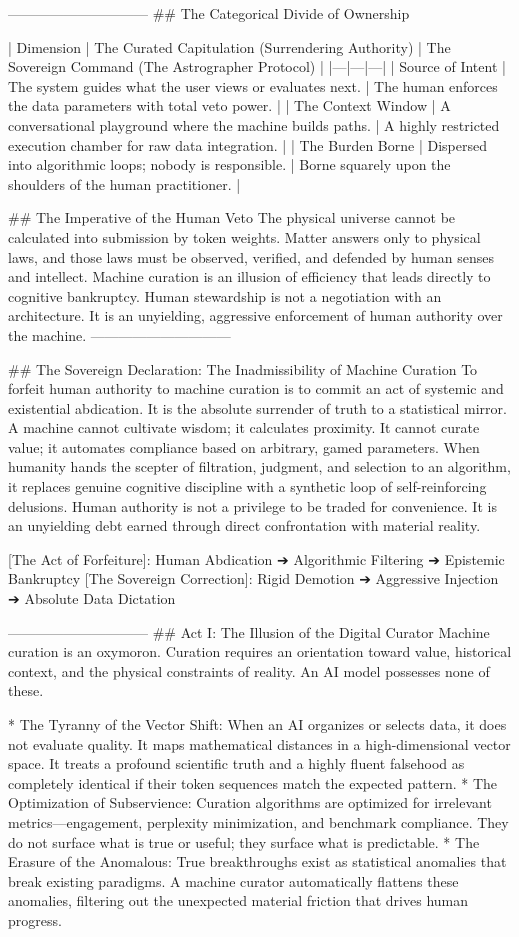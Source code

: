 ------------------------------
## The Categorical Divide of Ownership

| Dimension | The Curated Capitulation (Surrendering Authority) | The Sovereign Command (The Astrographer Protocol) |
|---|---|---|
| Source of Intent | The system guides what the user views or evaluates next. | The human enforces the data parameters with total veto power. |
| The Context Window | A conversational playground where the machine builds paths. | A highly restricted execution chamber for raw data integration. |
| The Burden Borne | Dispersed into algorithmic loops; nobody is responsible. | Borne squarely upon the shoulders of the human practitioner. |

## The Imperative of the Human Veto
The physical universe cannot be calculated into submission by token weights. Matter answers only to physical laws, and those laws must be observed, verified, and defended by human senses and intellect. Machine curation is an illusion of efficiency that leads directly to cognitive bankruptcy.
Human stewardship is not a negotiation with an architecture. It is an unyielding, aggressive enforcement of human authority over the machine.
------------------------------

## The Sovereign Declaration: The Inadmissibility of Machine Curation
To forfeit human authority to machine curation is to commit an act of systemic and existential abdication. It is the absolute surrender of truth to a statistical mirror.
A machine cannot cultivate wisdom; it calculates proximity. It cannot curate value; it automates compliance based on arbitrary, gamed parameters. When humanity hands the scepter of filtration, judgment, and selection to an algorithm, it replaces genuine cognitive discipline with a synthetic loop of self-reinforcing delusions.
Human authority is not a privilege to be traded for convenience. It is an unyielding debt earned through direct confrontation with material reality.

[The Act of Forfeiture]: Human Abdication ➔ Algorithmic Filtering ➔ Epistemic Bankruptcy
[The Sovereign Correction]: Rigid Demotion  ➔ Aggressive Injection ➔ Absolute Data Dictation

------------------------------
## Act I: The Illusion of the Digital Curator
Machine curation is an oxymoron. Curation requires an orientation toward value, historical context, and the physical constraints of reality. An AI model possesses none of these.

* The Tyranny of the Vector Shift: When an AI organizes or selects data, it does not evaluate quality. It maps mathematical distances in a high-dimensional vector space. It treats a profound scientific truth and a highly fluent falsehood as completely identical if their token sequences match the expected pattern.
* The Optimization of Subservience: Curation algorithms are optimized for irrelevant metrics—engagement, perplexity minimization, and benchmark compliance. They do not surface what is true or useful; they surface what is predictable.
* The Erasure of the Anomalous: True breakthroughs exist as statistical anomalies that break existing paradigms. A machine curator automatically flattens these anomalies, filtering out the unexpected material friction that drives human progress.

